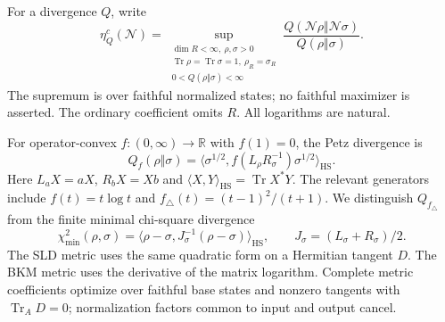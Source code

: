 \documentclass[11pt]{article}
\theoremstyle{remark}\newtheorem{remark}[theorem]{Remark}
\newcommand{\Tr}{\operatorname{Tr}}
\newcommand{\N}{\mathcal N}
\newcommand{\HS}{\mathrm{HS}}
\begin{document}
For a divergence $Q$, write
\begin{equation}\label{eq:complete}
 \eta_Q^c(\N)=\sup_{\substack{\dim R<\infty,\ \rho,\sigma>0\\
 \Tr\rho=\Tr\sigma=1,\ \rho_R=\sigma_R\\0<Q(\rho\Vert\sigma)<\infty}}
 \frac{Q(\N\rho\Vert\N\sigma)}{Q(\rho\Vert\sigma)}.
\end{equation}
The supremum is over faithful normalized states; no faithful maximizer is asserted. The ordinary coefficient omits $R$. All logarithms are natural.

For operator-convex $f:(0,\infty)\to\mathbb R$ with $f(1)=0$, the Petz divergence is
\begin{equation}\label{eq:petz}
 Q_f(\rho\Vert\sigma)=
 \langle\sigma^{1/2},f(L_\rho R_\sigma^{-1})\sigma^{1/2}\rangle_{\HS}.
\end{equation}
Here $L_a X=aX$, $R_b X=Xb$ and $\langle X,Y\rangle_{\HS}=\Tr X^*Y$. The relevant generators include $f(t)=t\log t$ and $f_\triangle(t)=(t-1)^2/(t+1)$. We distinguish $Q_{f_\triangle}$ from the finite minimal chi-square divergence
\[
 \chi_{\min}^2(\rho,\sigma)=
 \langle\rho-\sigma,J_\sigma^{-1}(\rho-\sigma)\rangle_{\HS},
 \qquad J_\sigma=(L_\sigma+R_\sigma)/2.
\]
The SLD metric uses the same quadratic form on a Hermitian tangent $D$. The BKM metric uses the derivative of the matrix logarithm. Complete metric coefficients optimize over faithful base states and nonzero tangents with $\Tr_A D=0$; normalization factors common to input and output cancel.
\end{document}

